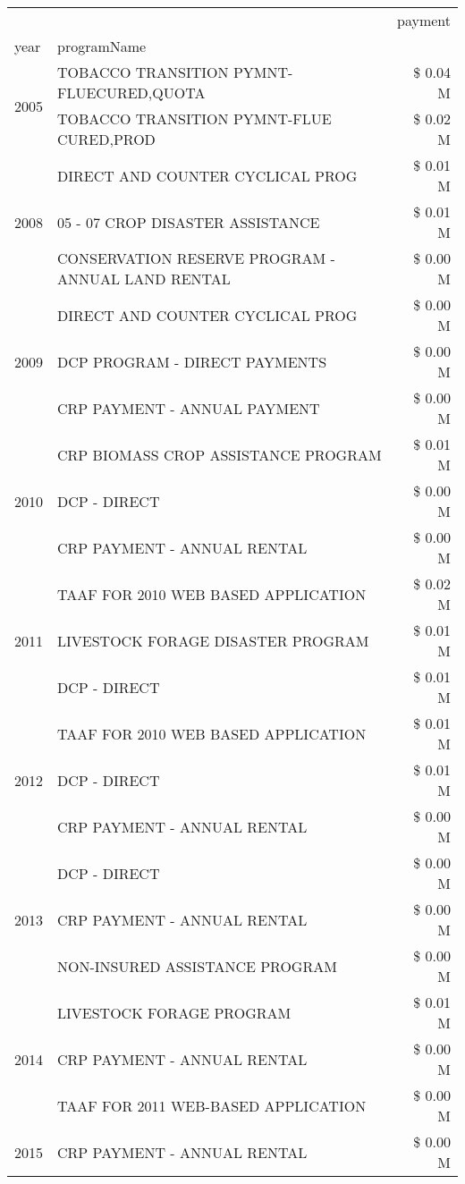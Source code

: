 \begin{tabular}{llr}
\toprule
 &  & payment \\
year & programName &  \\
\midrule
\multirow[t]{2}{*}{2005} & TOBACCO TRANSITION PYMNT-FLUECURED,QUOTA & \$ 0.04 M \\
 & TOBACCO TRANSITION PYMNT-FLUE CURED,PROD & \$ 0.02 M \\
\cline{1-3}
\multirow[t]{3}{*}{2008} & DIRECT AND COUNTER CYCLICAL PROG & \$ 0.01 M \\
 & 05 - 07 CROP DISASTER ASSISTANCE & \$ 0.01 M \\
 & CONSERVATION RESERVE PROGRAM - ANNUAL LAND RENTAL & \$ 0.00 M \\
\cline{1-3}
\multirow[t]{3}{*}{2009} & DIRECT AND COUNTER CYCLICAL PROG & \$ 0.00 M \\
 & DCP PROGRAM - DIRECT PAYMENTS & \$ 0.00 M \\
 & CRP PAYMENT - ANNUAL PAYMENT & \$ 0.00 M \\
\cline{1-3}
\multirow[t]{3}{*}{2010} & CRP BIOMASS CROP ASSISTANCE PROGRAM & \$ 0.01 M \\
 & DCP - DIRECT & \$ 0.00 M \\
 & CRP PAYMENT - ANNUAL RENTAL & \$ 0.00 M \\
\cline{1-3}
\multirow[t]{3}{*}{2011} & TAAF FOR 2010 WEB BASED APPLICATION & \$ 0.02 M \\
 & LIVESTOCK FORAGE DISASTER PROGRAM & \$ 0.01 M \\
 & DCP - DIRECT & \$ 0.01 M \\
\cline{1-3}
\multirow[t]{3}{*}{2012} & TAAF FOR 2010 WEB BASED APPLICATION & \$ 0.01 M \\
 & DCP - DIRECT & \$ 0.01 M \\
 & CRP PAYMENT - ANNUAL RENTAL & \$ 0.00 M \\
\cline{1-3}
\multirow[t]{3}{*}{2013} & DCP - DIRECT & \$ 0.00 M \\
 & CRP PAYMENT - ANNUAL RENTAL & \$ 0.00 M \\
 & NON-INSURED ASSISTANCE PROGRAM & \$ 0.00 M \\
\cline{1-3}
\multirow[t]{3}{*}{2014} & LIVESTOCK FORAGE PROGRAM & \$ 0.01 M \\
 & CRP PAYMENT - ANNUAL RENTAL & \$ 0.00 M \\
 & TAAF FOR 2011 WEB-BASED APPLICATION & \$ 0.00 M \\
\cline{1-3}
\multirow[t]{3}{*}{2015} & CRP PAYMENT - ANNUAL RENTAL & \$ 0.00 M \\

\end{tabular}
